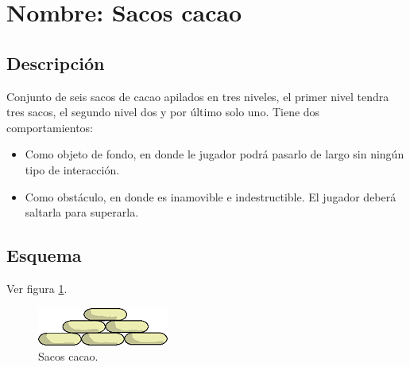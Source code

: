\section{Nombre: Sacos cacao}\label{obs.saco}
\subsection{Descripción}
Conjunto de seis sacos de cacao apilados en tres niveles, el primer nivel tendra tres sacos, el segundo nivel dos y por último solo uno. Tiene dos comportamientos:
\begin{itemize}
	\item Como objeto de fondo, en donde le jugador podrá pasarlo de largo sin ningún tipo de interacción. 
	\item Como obstáculo, en donde es inamovible e indestructible. El jugador deberá saltarla para superarla.
\end{itemize}
\subsection{Esquema}
Ver figura \ref{fig:sacosCacao}.
\begin{figure}
	\centering
	\includegraphics[height=0.1 \textheight]{Imagenes/cacao02}
	\caption{Sacos cacao.}
	\label{fig:sacosCacao}
\end{figure}